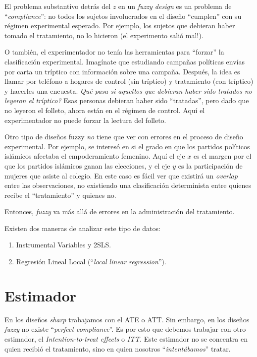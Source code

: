 \documentclass[onesided]{article}\usepackage[]{graphicx}\usepackage[]{color}
\begin{document}
El problema substantivo detr\'as del $z$ en un \emph{fuzzy design} es un problema de ``\emph{compliance}'': no todos los sujetos involucrados en el dise\~no ``cumplen'' con su r\'egimen experimental esperado. Por ejemplo, los sujetos que debieran haber tomado el tratamiento, no lo hicieron (el experimento sali\'o mal!). 

O tambi\'en, el experimentador no ten\'ia las herramientas para ``forzar'' la clasificaci\'on experimental. Imag\'inate que estudiando campa\~nas pol\'iticas env\'ias por carta un tr\'iptico con informaci\'on sobre una campa\~na. Despu\'es, la idea es llamar por tel\'efono a hogares de control (sin tr\'iptico) y tratamiento (con tr\'iptico) y hacerles una encuesta. \emph{Qu\'e pasa si aquellos que debieran haber sido tratados no leyeron el tr\'iptico?} Esas personas debieran haber sido ``tratadas'', pero dado que no leyeron el folleto, ahora est\'an en el r\'egimen de control. Aqu\'i el experimentador no puede forzar la lectura del folleto. 

Otro tipo de dise\~nos fuzzy \emph{no} tiene que ver con errores en el proceso de dise\~no experimental. Por ejemplo, \textcite[244]{ErikMe2014} se interes\'o en si el grado en que los partidos pol\'iticos isl\'amicos afectaba el empoderamiento femenino. Aqu\'i el eje $x$ es el margen por el que los partidos isl\'amicos ganan las elecciones, y el eje $y$ es la participaci\'on de mujeres que asiste al colegio. En este caso es f\'acil ver que existir\'a un \emph{overlap} entre las observaciones, no existiendo una clasificaci\'on determinista entre quienes recibe el ``tratamiento'' y quienes no.

Entonces, \emph{fuzzy} va m\'as all\'a de errores en la administraci\'on del tratamiento.

Existen dos maneras de analizar este tipo de datos:

\begin{enumerate}
  \item Instrumental Variables y 2SLS.
  \item Regresi\'on Lineal Local (``\emph{local linear regression}'').
\end{enumerate}

\section{Estimador}

En los dise\~nos \emph{sharp} trabajamos con el ATE o ATT. Sin embargo, en los dise\~nos \emph{fuzzy} no existe ``\emph{perfect compliance}''. Es por esto que debemos trabajar con otro estimador, el \emph{Intention-to-treat effects} o \emph{ITT}. Este estimador no se concentra en quien recibi\'o el tratamiento, sino en quien nosotros ``\emph{intent\'abamos}'' tratar.
\end{document}
